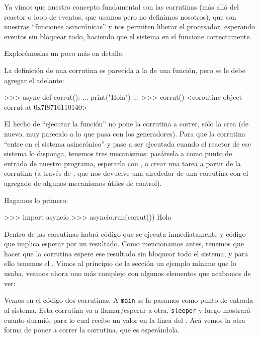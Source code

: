 Ya vimos que nuestro concepto fundamental son las corrutinas (más allá del reactor o loop de eventos, que usamos pero no definimos nosotros), que son nuestras ``funciones asincrónicas'' y nos permiten liberar el procesador, esperando eventos sin bloquear todo, haciendo que el sistema en sí funcione correctamente.

Explorémoslas un poco más en detalle.

La definición de una corrutina es parecida a la de una función, pero se le debe agregar el  adelante:

\begin{py}
>>> async def corrut():
...   print("Hola")
...
>>> corrut()
<coroutine object corrut at 0x7f8716110140>
\end{py}

El hecho de ``ejecutar la función'' no pone la corrutina a correr, sólo la crea (de nuevo, muy parecido a lo que pasa con los generadores). Para que la corrutina ``entre en el sistema asincrónico'' y pase a ser ejecutada cuando el reactor de ese sistema lo disponga, tenemos tres mecanismos: pasársela a  como punto de entrada de nuestro programa, esperarla con , o crear una tarea a partir de la corrutina (a través de , que nos devuelve una  alrededor de una corrutina con el agregado de algunos mecanismos útiles de control).

Hagamos lo primero:

\begin{py}
>>> import asyncio
>>> asyncio.run(corrut())
Hola
\end{py}

Dentro de las corrutinas habrá código que se ejecuta inmediatamente y código que implica esperar por un resultado. Como mencionamos antes, tenemos que hacer que la corrutina espere ese resultado sin bloquear todo el sistema, y para ello tenemos el . Vimos al principio de la sección un ejemplo mínimo que lo usaba, veamos ahora uno más complejo con algunos elementos que acabamos de ver:


Vemos en el código dos corrutinas. A \texttt{main} se la pasamos como punto de entrada al sistema. Esta corrutina va a llamar/esperar a otra, \texttt{sleeper} y luego mostrará cuanto durmió, para lo cual recibe un valor en la linea del . Acá vemos la otra forma de poner a correr la corrutina, que es esperándola.

